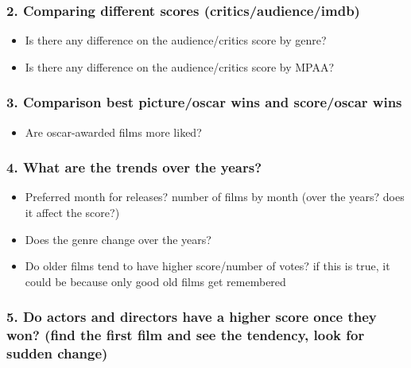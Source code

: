 \documentclass[]{article}
\providecommand{\tightlist}{%
  \setlength{\itemsep}{0pt}\setlength{\parskip}{0pt}}
\begin{document}
\hypertarget{comparing-different-scores-criticsaudienceimdb}{%
\subsubsection{2. Comparing different scores
(critics/audience/imdb)}\label{comparing-different-scores-criticsaudienceimdb}}

\begin{itemize}
\tightlist
\item
  Is there any difference on the audience/critics score by genre?
\item
  Is there any difference on the audience/critics score by MPAA?
\end{itemize}

\hypertarget{comparison-best-pictureoscar-wins-and-scoreoscar-wins}{%
\subsubsection{3. Comparison best picture/oscar wins and score/oscar
wins}\label{comparison-best-pictureoscar-wins-and-scoreoscar-wins}}

\begin{itemize}
\tightlist
\item
  Are oscar-awarded films more liked?
\end{itemize}

\hypertarget{what-are-the-trends-over-the-years}{%
\subsubsection{4. What are the trends over the
years?}\label{what-are-the-trends-over-the-years}}

\begin{itemize}
\tightlist
\item
  Preferred month for releases? number of films by month (over the
  years? does it affect the score?)
\item
  Does the genre change over the years?
\item
  Do older films tend to have higher score/number of votes? if this is
  true, it could be because only good old films get remembered
\end{itemize}

\hypertarget{do-actors-and-directors-have-a-higher-score-once-they-won-find-the-first-film-and-see-the-tendency-look-for-sudden-change}{%
\subsubsection{5. Do actors and directors have a higher score once they
won? (find the first film and see the tendency, look for sudden
change)}\label{do-actors-and-directors-have-a-higher-score-once-they-won-find-the-first-film-and-see-the-tendency-look-for-sudden-change}}
\end{document}
